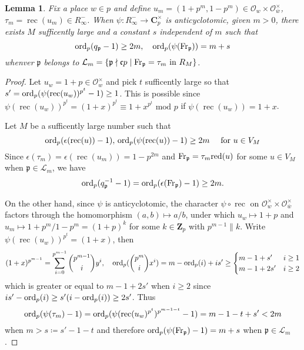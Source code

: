 \documentclass[leqno]{amsart}
\newcommand{\bw}{\overline{w}}
\newcommand{\Fr}{\textnormal{Fr}} %
\DeclareMathOperator{\rec}{rec}
\newcommand{\red}{\textnormal{red}}
\newcommand{\ord}{\textnormal{ord}}
\newcommand{\Zp}{\mathbf{Z}_p}
\newcommand{\C}{\mathbf C}
\newcommand{\oo}{\mathcal{O}} %
\newcommand{\fc}{\mathfrak{c}}
\newcommand{\fp}{\mathfrak{p}}
\newtheorem{lem}[thm]{Lemma}
\theoremstyle{definition}
\theoremstyle{remark}
\begin{document}
\begin{lem}\label{lem:estimate}
Fix a place $w\in p$ and
define $u_m=(1+p^m,1-p^m)\in \oo_w\times \oo_{\bw}^\times$,
$\tau_m=\rec(u_m)\in R_\infty^-$.
When $\psi\colon R_\infty^-\to \C_p^\times$
is anticyclotomic,
given $m>0$,
there exists  $M$ sufficently large
and a constant  $s$ independent of  $m$
such that 
\[
	\ord_p(q_\fp-1)\geq 2m,\quad
	\ord_p(\psi(\Fr_\fp))=m+s
\]
whenver $\fp$ belongs to 
$\mathcal{L}_m=
\{\fp\nmid \fc p\mid \Fr_\fp=\tau_m \text{ in } R_M\}$.
\end{lem}
\begin{proof}
Let $u_w=1+p\in \oo_w^\times$
and pick $t$ sufficently large so that
$s'=\ord_p(\psi(\rec(u_w))^{p^t}-1)\geq 1$.
This is possible since
$\psi(\rec(u_w))^{p^t}=(1+x)^{p^t}\equiv 
1+x^{p^t}\text{ mod }p$ if
$\psi(\rec(u_w))=1+x$.

Let $M$ be a sufficently large number such that
\[
	\ord_p(\epsilon(\rec(u))-1),\,
	\ord_p(\psi(\rec(u))-1)\geq 2m\quad
	\text{ for } u\in V_{M}
\]
Since 
$\epsilon(\tau_m)=\epsilon(\rec(u_m))=1-p^{2m}$
and $\Fr_\fp=\tau_m\red(u)$ for some $u\in V_M$
when $\fp\in \mathcal{L}_m$, we have 
\[
\ord_p(q_\fp^{-1}-1)=
\ord_p(\epsilon(\Fr_\fp)-1)\geq 2m.
\]

On the other hand,
since $\psi$ is anticyclotomic, the character
$\psi\circ \rec$ on $\oo_w^\times\times\oo_{\bw}^\times$
factors through the homomorphism $(a,b)\mapsto a/b$,
under which
$u_w\mapsto 1+p$ and
$u_m\mapsto 1+p^m/1-p^m=(1+p)^k$
for some $k\in \Zp$ with $p^{m-1}\parallel k$. 
Write $\psi(\rec(u_w))^{p^t}=(1+x)$, then
\[
	(1+x)^{p^{m-1}}=\sum_{i=0}^{p^{m-1}}
	\binom{p^{m-1}}{i}y^i,\quad
	\ord_p(\binom{p^m}{i}x^i)=m-\ord_p(i)+is'\geq
	\begin{cases}
		m-1+s'& i\geq 1\\
		m-1+2s' & i\geq 2
	\end{cases}
\]
which is greater or equal to $m-1+2s'$ when  $i\geq 2$
since  $is'-\ord_p(i)\geq s'(i-\ord_p(i))\geq 2s'$.
Thus 
\[
\ord_p(\psi(\tau_m)-1)=\ord_p(\psi(\rec(u_w)^{p^t})^{p^{m-1-t}}-1)
=m-1-t+s'<2m
\]
when $m>s\coloneqq s'-1-t$
and therefore
$\ord_p(\psi(\Fr_\fp)-1)=m+s$ when  $\fp\in\mathcal{L}_m$.
\end{proof}
\end{document}
